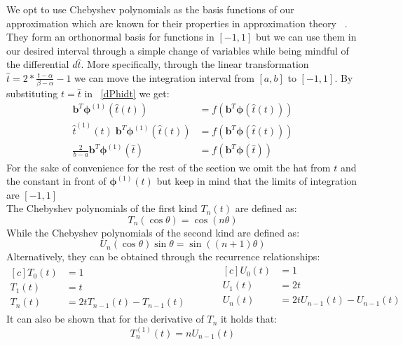 \documentclass[11pt]{report}
\begin{document}
    We opt to use Chebyshev polynomials as the basis functions of our approximation which are known for their
    properties in approximation theory ~\cite{trefethen1996finite}.
    They form an orthonormal basis for functions in $[-1,1]$ but we can use them in our desired interval through a
    simple change of variables while being mindful of the differential $d \hat{t}$.
    More specifically, through the linear transformation $\hat{t} = 2*\frac{ t -  \alpha} { \beta - \alpha} -1$ we can
    move the integration interval from $[a,b]$ to $[-1,1]$.
    By substituting $t = \hat{t}$  in ~\eqref{dPhidt} we get:
    \begin{align*}
        \pmb{b}^T \pmb{\phi}^{(1)}(\hat{t}(t)) &= f( \pmb{b}^T \pmb{\phi}(\hat{t}(t)) ) \\
        \hat{t}^{(1)}(t)  \;  \pmb{b}^T \pmb{\phi}^{(1)}(\hat{t}(t))  &= f( \pmb{b}^T \pmb{\phi}(\hat{t}(t)) ) \\
        \frac{2}{b-a} \pmb{b}^T \pmb{\phi}^{(1)}(\hat{t}) &= f( \pmb{b}^T \pmb{\phi}(\hat{t}) )
    \end{align*}
    For the sake of convenience for the rest of the section we omit the hat from $t$ and the constant in front of
    $\pmb{\phi}^{(1)}(t)$ but keep in mind that the limits of integration are $[-1,1]$
    \\

    The Chebyshev polynomials of the first kind $T_n(t)$ are defined as:
    \begin{equation*}
        T_n(\cos \theta) = \cos(n \theta)
    \end{equation*}
    While the Chebyshev polynomials of the second kind are defined as:
    \begin{equation*}
        U_n(\cos \theta) \sin \theta = \sin( (n+1)\theta )
    \end{equation*}
    Alternatively, they can be obtained through the recurrence relationships:
    \begin{equation}
        \label{eq:cheb_rec}
        \begin{aligned}[c]
            T_0(t) &= 1 \\
            T_1(t) &= t \\
            T_n(t) &= 2tT_{n-1}(t) - T_{n-1}(t)
        \end{aligned}
        \qquad \quad
        \begin{aligned}[c]
            U_0(t) &= 1 \\
            U_1(t) &= 2t\\
            U_n(t) &= 2tU_{n-1}(t) - U_{n-1}(t)\\
        \end{aligned}
    \end{equation}
    It can also be shown that for the derivative of $T_n$ it holds that:
    \begin{equation}
        T_n^{(1)}(t) = n U_{n-1}(t)
        \label{Dcheb}
    \end{equation}
\end{document}
